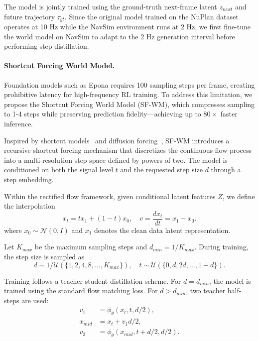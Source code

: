 \documentclass[runningheads]{llncs}
\begin{document}
The model is jointly trained using the ground-truth next-frame latent $z_{next}$ and future trajectory $\tau_{gt}$. 
Since the original model trained on the NuPlan dataset operates at 10 Hz while the NavSim environment runs at 2 Hz, we first fine-tune the world model on NavSim to adapt to the 2 Hz generation interval before performing step distillation.

\paragraph{\textbf{Shortcut Forcing World Model.}}
\label{sect:shortcut_wm}

Foundation models such as Epona requires 100 sampling steps per frame, creating prohibitive latency for high-frequency RL training. To address this limitation, we propose the Shortcut Forcing World Model (SF-WM), which compresses sampling to 1-4 steps while preserving prediction fidelity—achieving up to $80\times$ faster inference.

Inspired by shortcut models~\cite{frans2024one} and diffusion forcing~\cite{chen2024diffusion}, SF-WM introduces a recursive shortcut forcing mechanism that discretizes the continuous flow process into a multi-resolution step space defined by powers of two. The model is conditioned on both the signal level $t$ and the requested step size $d$ through a step embedding.

Within the rectified flow framework, given conditional latent features $Z$, we define the interpolation
\begin{equation}
x_t = t x_1 + (1-t)x_0,\quad v=\frac{dx_t}{dt}=x_1-x_0.
\end{equation}
where $x_0\sim\mathcal{N}(0,I)$ and $x_1$ denotes the clean data latent representation.

Let $K_{max}$ be the maximum sampling steps and $d_{min}=1/K_{max}$. During training, the step size is sampled as
\begin{equation}
d \sim 1/\mathcal{U}(\{1,2,4,8,\dots,K_{max}\}),\quad 
t \sim \mathcal{U}(\{0,d,2d,\dots,1-d\}).
\end{equation}

Training follows a teacher-student distillation scheme. For $d=d_{min}$, the model is trained using the standard flow matching loss. For $d>d_{min}$, two teacher half-steps are used:
\begin{align}
v_1 &= \phi_\theta(x_t,t,d/2), \\
x_{mid} &= x_t + v_1 d/2, \\
v_2 &= \phi_\theta(x_{mid},t+d/2,d/2).
\end{align}
\end{document}
